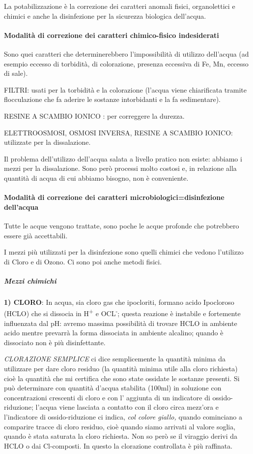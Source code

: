 La potabilizzazione è la correzione dei caratteri anomali fisici,
organolettici e chimici e anche la disinfezione per la sicurezza
biologica dell'acqua.

\paragraph{Modalità di correzione dei caratteri chimico-fisico indesiderati}

Sono quei caratteri che determinerebbero l'impossibilità di utilizzo
dell'acqua (ad esempio eccesso di torbidità, di colorazione, presenza
eccessiva di Fe, Mn, eccesso di sale).

FILTRI: usati per la torbidità e la colorazione (l'acqua viene
chiarificata tramite flocculazione che fa aderire le sostanze
intorbidanti e la fa sedimentare).

RESINE A SCAMBIO IONICO : per correggere la durezza.

ELETTROOSMOSI, OSMOSI INVERSA, RESINE A SCAMBIO IONICO: utilizzate per
la dissalazione.

Il problema dell'utilizzo dell'acqua salata a livello pratico non
esiste: abbiamo i mezzi per la dissalazione. Sono però processi molto
costosi e, in relazione alla quantità di acqua di cui abbiamo bisogno,
non è conveniente.

\paragraph{Modalità di correzione dei caratteri microbiologici=disinfezione dell'acqua}

Tutte le acque vengono trattate, sono poche le acque profonde che
potrebbero essere già accettabili.

I mezzi più utilizzati per la disinfezione sono quelli chimici che
vedono l'utilizzo di Cloro e di Ozono. Ci sono poi anche metodi fisici.

\subparagraph{Mezzi chimichi}

\textbf{1) CLORO}: In acqua, sia cloro gas che ipocloriti, formano acido
Ipocloroso (HCLO) che si dissocia in H\textsuperscript{+} e
OCL\textsuperscript{-}; questa reazione è instabile e fortemente
influenzata dal pH: avremo massima possibilità di trovare HCLO in
ambiente acido mentre prevarrà la forma dissociata in ambiente alcalino;
quando è dissociato non è più disinfettante.

\emph{CLORAZIONE SEMPLICE} ci dice semplicemente la quantità minima da
utilizzare per dare cloro residuo (la quantità minima utile alla cloro
richiesta) cioè la quantità che mi certifica che sono state ossidate le
sostanze presenti. Si può determinare con quantità d'acqua stabilita
(100ml) in soluzione con concentrazioni crescenti di cloro e con l'
aggiunta di un indicatore di ossido-riduzione; l'acqua viene lasciata a
contatto con il cloro circa mezz'ora e l'indicatore di ossido-riduzione
ci indica, \emph{col colore giallo,} quando cominciano a comparire
tracce di cloro residuo, cioè quando siamo arrivati al valore soglia,
quando è stata saturata la cloro richiesta. Non so però se il viraggio
derivi da HCLO o dai Cl-composti. In questo la clorazione controllata è
più raffinata.

